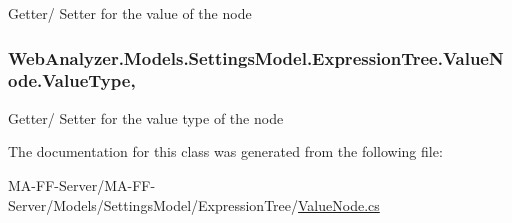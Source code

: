 Getter/ Setter for the value of the node 

\hypertarget{class_web_analyzer_1_1_models_1_1_settings_model_1_1_expression_tree_1_1_value_node_aa1c55c593ae80ac78221c1397ede5ab2}{}
\subsubsection[{Value\+Type}]{ Web\+Analyzer.\+Models.\+Settings\+Model.\+Expression\+Tree.\+Value\+Node.\+Value\+Type\hspace{0.3cm}{\ttfamily [get]}, {\ttfamily [set]}}\label{class_web_analyzer_1_1_models_1_1_settings_model_1_1_expression_tree_1_1_value_node_aa1c55c593ae80ac78221c1397ede5ab2}


Getter/ Setter for the value type of the node 



The documentation for this class was generated from the following file\+:\begin{DoxyCompactItemize}
\item 
M\+A-\/\+F\+F-\/\+Server/\+M\+A-\/\+F\+F-\/\+Server/\+Models/\+Settings\+Model/\+Expression\+Tree/\hyperlink{_value_node_8cs}{Value\+Node.\+cs}\end{DoxyCompactItemize}
